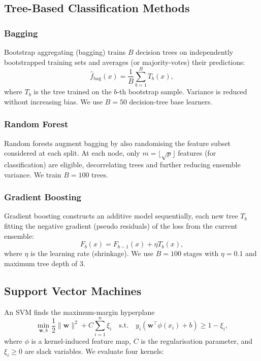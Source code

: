 \documentclass[conference]{IEEEtran}
\begin{document}
\subsection{Tree-Based Classification Methods}

\subsubsection{Bagging}
Bootstrap aggregating (bagging) \cite{breiman1996bagging} trains $B$
decision trees on independently bootstrapped training sets and averages
(or majority-votes) their predictions:
\begin{equation}
  \hat{f}_{\text{bag}}(x) = \frac{1}{B} \sum_{b=1}^{B} T_b(x),
  \label{eq:bagging}
\end{equation}
where $T_b$ is the tree trained on the $b$-th bootstrap sample. Variance is
reduced without increasing bias. We use $B = 50$ decision-tree base learners.

\subsubsection{Random Forest}
Random forests \cite{breiman2001rf} augment bagging by also randomising the
feature subset considered at each split. At each node, only $m = \lfloor
\sqrt{p} \rfloor$ features (for classification) are eligible, decorrelating
trees and further reducing ensemble variance. We train $B = 100$ trees.

\subsubsection{Gradient Boosting}
Gradient boosting \cite{friedman2001gbm} constructs an additive model
sequentially, each new tree $T_b$ fitting the negative gradient (pseudo
residuals) of the loss from the current ensemble:
\begin{equation}
  F_b(x) = F_{b-1}(x) + \eta T_b(x),
  \label{eq:gbm}
\end{equation}
where $\eta$ is the learning rate (shrinkage). We use $B = 100$ stages with
$\eta = 0.1$ and maximum tree depth of 3.

\subsection{Support Vector Machines}

An SVM \cite{cortes1995svm} finds the maximum-margin hyperplane
\begin{equation}
  \min_{\mathbf{w},b} \frac{1}{2}\|\mathbf{w}\|^2 + C \sum_{i=1}^{n} \xi_i
  \quad \text{s.t.} \quad y_i(\mathbf{w}^\top \phi(x_i)+b) \geq 1 - \xi_i,
  \label{eq:svm}
\end{equation}
where $\phi$ is a kernel-induced feature map, $C$ is the regularisation
parameter, and $\xi_i \geq 0$ are slack variables. We evaluate four kernels:
\end{document}
